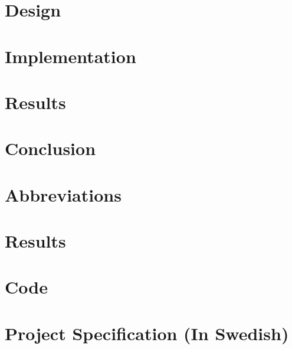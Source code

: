 \documentclass[12pt,twoside]{kau_report}
\begin{document}
\section{Design}
\label{sec:design}

\cleardoublepage

\section{Implementation}
\label{sec:implementation}

\cleardoublepage

\section{Results} %
\label{sec:resultevaluation}

\cleardoublepage

\section{Conclusion}
\label{sec:conclusion}

\cleardoublepage


\begin{singlespace}


\end{singlespace}
\cleardoublepage

\appendix
\section{Abbreviations}
\label{sec:abbreviations}

\cleardoublepage

\section{Results}
\label{app:results}



\cleardoublepage

\section{Code}
\cleardoublepage

\section{Project Specification (In Swedish)}
\end{document}
